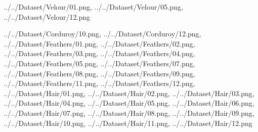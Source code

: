 \documentclass[12pt,a4paper]{article}
\begin{document}
\begin{singlespace}
{../../Dataset/Velour/01.png,
../../Dataset/Velour/05.png,
../../Dataset/Velour/12.png}

{../../Dataset/Corduroy/10.png,
../../Dataset/Corduroy/12.png,
../../Dataset/Feathers/01.png,
../../Dataset/Feathers/02.png,
../../Dataset/Feathers/03.png,
../../Dataset/Feathers/04.png,
../../Dataset/Feathers/05.png,
../../Dataset/Feathers/07.png,
../../Dataset/Feathers/08.png,
../../Dataset/Feathers/09.png,
../../Dataset/Feathers/11.png,
../../Dataset/Feathers/12.png,
../../Dataset/Hair/01.png,
../../Dataset/Hair/02.png,
../../Dataset/Hair/03.png,
../../Dataset/Hair/04.png,
../../Dataset/Hair/05.png,
../../Dataset/Hair/06.png,
../../Dataset/Hair/07.png,
../../Dataset/Hair/08.png,
../../Dataset/Hair/09.png,
../../Dataset/Hair/10.png,
../../Dataset/Hair/11.png,
../../Dataset/Hair/12.png}


\end{singlespace}
\end{document}
